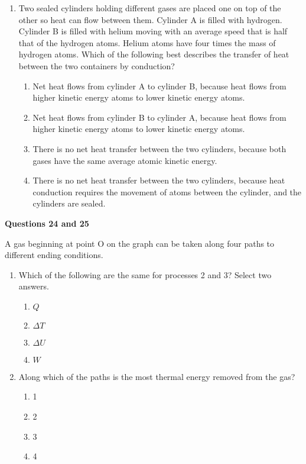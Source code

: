 \documentclass{../../oss-apphys}
\begin{document}
\begin{multicols}{2}
\begin{enumerate}[leftmargin=18pt,start=3]
  \item Two sealed cylinders holding different gases are placed one on top of
    the other so heat can flow between them. Cylinder A is filled with
    hydrogen. Cylinder B is filled with helium moving with an average speed
    that is half that of the hydrogen atoms. Helium atoms have four times the
    mass of hydrogen atoms. Which of the following best describes the transfer
    of heat between the two containers by conduction?
    \begin{enumerate}[noitemsep,topsep=0pt,leftmargin=18pt,label=(\Alph*)]
    \item Net heat flows from cylinder A to cylinder B, because heat flows from
      higher kinetic energy atoms to lower kinetic energy atoms.
    \item Net heat flows from cylinder B to cylinder A, because heat flows from
      higher kinetic energy atoms to lower kinetic energy atoms.
    \item There is no net heat transfer between the two cylinders, because both
      gases have the same average atomic kinetic energy.
    \item There is no net heat transfer between the two cylinders, because heat
      conduction requires the movement of atoms between the cylinder, and the
      cylinders are sealed.
    \end{enumerate}
  \end{enumerate}
  
  \textbf{Questions 24 and 25}

  A gas beginning at point O on the graph can be taken along four paths to
  different ending conditions.

  \begin{enumerate}[leftmargin=18pt,start=24]

  \item Which of the following are the same for processes 2 and 3? Select two
    answers.
    \begin{enumerate}[noitemsep,topsep=0pt,leftmargin=18pt,label=(\Alph*)]
    \item $Q$
    \item $\Delta T$
    \item $\Delta U$
    \item $W$
    \end{enumerate}
    
  \item Along which of the paths is the most thermal energy removed from the
    gas?
    \begin{enumerate}[noitemsep,topsep=0pt,leftmargin=18pt,label=(\Alph*)]
      \item\num{1}
      \item\num{2}
      \item\num{3}
      \item\num{4}
    \end{enumerate}
    

\end{enumerate}
\end{multicols}
\end{document}
